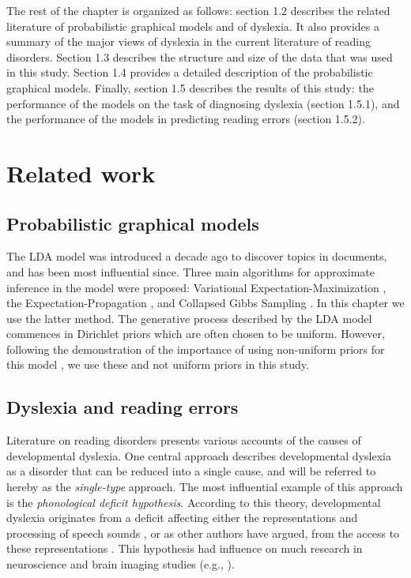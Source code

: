 The rest of the chapter is organized as follows: section 1.2 describes the related literature of probabilistic graphical models and of dyslexia. It also provides a summary of the major views of dyslexia in the current literature of reading disorders. Section 1.3 describes the structure and size of the data that was used in this study. Section 1.4 provides a detailed description of the probabilistic graphical models. Finally, section 1.5 describes the results of this study: the performance of the models on the task of diagnosing dyslexia (section 1.5.1), and the performance of the models in predicting reading errors (section 1.5.2).


\section{Related work}
\subsection{Probabilistic graphical models}
The LDA model was introduced a decade ago to discover topics in documents, and has been most influential since. Three main algorithms for approximate inference in the model were proposed: Variational Expectation-Maximization \citep{bnj03}, the Expectation-Propagation \citep{ml02}, and Collapsed Gibbs Sampling \citep{gs04}. In this chapter we use the latter method. The generative process described by the LDA model commences in Dirichlet priors which are often chosen to be uniform. However, following the demonstration of the importance of using non-uniform priors for this model \citep{wmm09}, we use these and not uniform priors in this study.

\subsection{Dyslexia and reading errors}
Literature on reading disorders presents various accounts of the causes of developmental dyslexia. One central approach describes developmental dyslexia as a disorder that can be reduced into a single cause, and will be referred to hereby as the {\it single-type} approach. The most influential example of this approach is the {\it phonological deficit hypothesis}. According to this theory, developmental dyslexia originates from a deficit affecting either the representations and processing of speech sounds \citep{ss05, s00, s98}, or as other authors have argued, from the access to these representations \citep{rs08}. This hypothesis had influence on much research in neuroscience and brain imaging studies (e.g., \citealp{bdvsgmg13, d09, vgpsh13, grggvfb02, r14, rrddcw03}).

